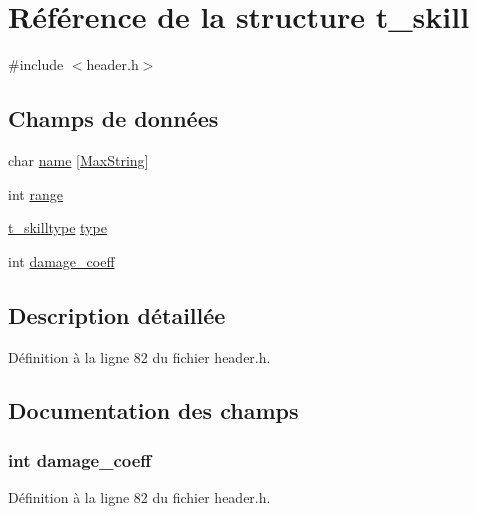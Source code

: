 \hypertarget{structt__skill}{\section{Référence de la structure t\+\_\+skill}
\label{structt__skill}
}


{\ttfamily \#include $<$header.\+h$>$}

\subsection*{Champs de données}
\begin{DoxyCompactItemize}
\item 
char \hyperlink{structt__skill_ab27f28c5ead39031421706ddbbd1edea}{name} \mbox{[}\hyperlink{header_8h_ab154998a3a376095f3601bc35c5cf523}{Max\+String}\mbox{]}
\item 
int \hyperlink{structt__skill_a037e8e370380046bec287bdc96942091}{range}
\item 
\hyperlink{header_8h_a440f669d36bc2028077af38574051204}{t\+\_\+skilltype} \hyperlink{structt__skill_ac00edc3c188c78c47878a357ecff2954}{type}
\item 
int \hyperlink{structt__skill_a9518a5f7d916a01def3588da5dc0c8fa}{damage\+\_\+coeff}
\end{DoxyCompactItemize}


\subsection{Description détaillée}


Définition à la ligne 82 du fichier header.\+h.



\subsection{Documentation des champs}
\hypertarget{structt__skill_a9518a5f7d916a01def3588da5dc0c8fa}{
\subsubsection[{damage\+\_\+coeff}]{\setlength{\rightskip}{0pt plus 5cm}int damage\+\_\+coeff}}\label{structt__skill_a9518a5f7d916a01def3588da5dc0c8fa}


Définition à la ligne 82 du fichier header.\+h.

